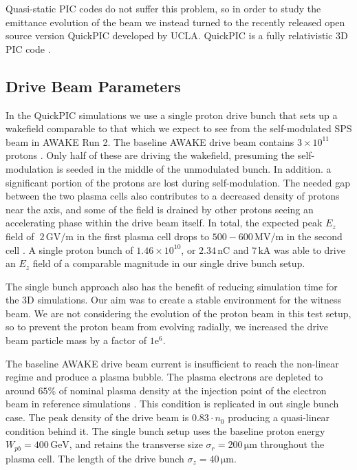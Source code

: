\documentclass[aps,prstab,reprint,amsmath,amssymb,groupedaddress]{revtex4-1}
\newcommand{\unit}[1]{\,\mathrm{#1}}
\newcommand{\funit}[2]{\,\mathrm{#1}/\mathrm{#2}}
\newcommand{\mexp}[1]{\mathrm{e}^{#1}}
\newcommand{\nexp}[1]{\times 10^{#1}}
\begin{document}
Quasi-static PIC codes do not suffer this problem, so in order to study the emittance evolution of the beam we instead
turned to the recently released open source version QuickPIC developed by UCLA. QuickPIC is a fully relativistic 3D PIC
code \cite{huang:2006, an:2013}.

\subsection[\label{S:M:Setup}]{Drive Beam Parameters}

In the QuickPIC simulations we use a single proton drive bunch that sets up a wakefield comparable to that which we
expect to see from the self-modulated SPS beam in AWAKE Run 2. The baseline AWAKE drive beam contains $3\nexp{11}$
protons \cite{gschwendtner:2016}. Only half of these are driving the wakefield, presuming the self-modulation is seeded
in the middle of the unmodulated bunch. In addition. a significant portion of the protons are lost during
self-modulation. The needed gap between the two plasma cells also contributes to a decreased density of protons near the
axis, and some of the field is drained by other protons seeing an accelerating phase within the drive beam itself. In
total, the expected peak $E_{z}$ field of $~2\funit{GV}{m}$ in the first plasma cell drops to $500-600\funit{MV}{m}$ in
the second cell \cite{awake_collaboration:2016}. A single proton bunch of $1.46\nexp{10}$, or $2.34\unit{nC}$ and
$7\unit{kA}$ was able to drive an $E_{z}$ field of a comparable magnitude in our single drive bunch setup.

The single bunch approach also has the benefit of reducing simulation time for the 3D simulations. Our aim was to create
a stable environment for the witness beam. We are not considering the evolution of the proton beam in this test setup,
so to prevent the proton beam from evolving radially, we increased the drive beam particle mass by a factor of
$1\mexp{6}$.

The baseline AWAKE drive beam current is insufficient to reach the non-linear regime and produce a plasma bubble. The
plasma electrons are depleted to around $65\%$ of nominal plasma density at the injection point of the electron beam in
reference simulations \cite{awake_collaboration:2016}. This condition is replicated in out single bunch case. The peak
density of the drive beam is $0.83\cdot n_{0}$ producing a quasi-linear condition behind it. The single bunch setup uses
the baseline proton energy $W_{pb} = 400\unit{GeV}$, and retains the transverse size $\sigma_{r} = 200\unit{\mu m}$
throughout the plasma cell. The length of the drive bunch $\sigma_{z} = 40\unit{\mu m}$.
\end{document}
